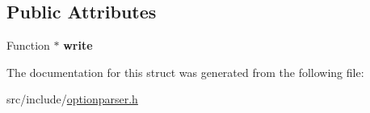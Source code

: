 \subsection*{Public Attributes}
\begin{DoxyCompactItemize}
\item 
\hypertarget{structxmem_1_1config_1_1third__party_1_1_print_usage_implementation_1_1_function_writer_a15527210bafed3bf8accf1071a2ed710}{Function $\ast$ {\bfseries write}}\label{structxmem_1_1config_1_1third__party_1_1_print_usage_implementation_1_1_function_writer_a15527210bafed3bf8accf1071a2ed710}

\end{DoxyCompactItemize}


The documentation for this struct was generated from the following file\-:\begin{DoxyCompactItemize}
\item 
src/include/\hyperlink{optionparser_8h}{optionparser.\-h}\end{DoxyCompactItemize}
